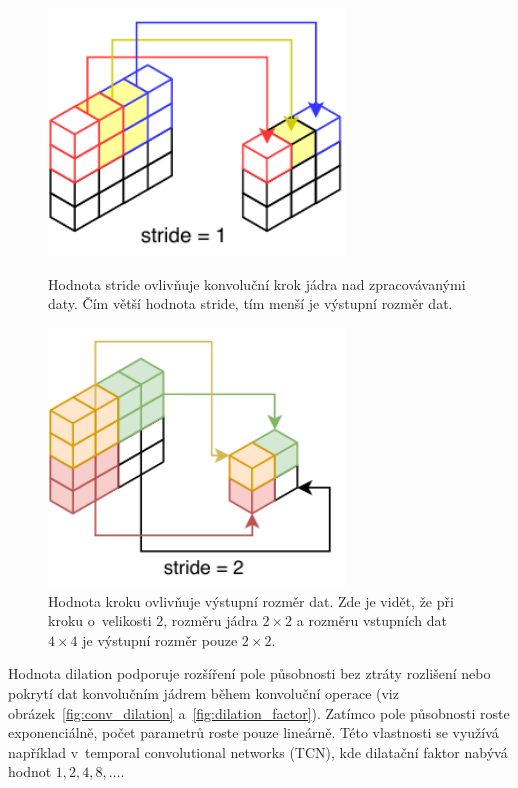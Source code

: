 \begin{figure}[H]
    \centering
    \begin{minipage}{0.45\textwidth}
        \centering
        \includegraphics[width=0.7\textwidth]{obrazky-figures/stride1.pdf}
        \caption{\label{fig:conv_stride1}Hodnota stride ovlivňuje konvoluční krok jádra nad zpracovávanými daty. Čím větší hodnota stride, tím menší je výstupní rozměr dat.}
    \end{minipage}\hfill
    \begin{minipage}{0.45\textwidth}
        \centering
        \includegraphics[width=0.7\textwidth]{obrazky-figures/stride2.pdf}
        \caption{\label{fig:conv_stride2}Hodnota kroku ovlivňuje výstupní rozměr dat. Zde je vidět, že při kroku o~velikosti $2$, rozměru jádra $2 \times 2$ a rozměru vstupních dat $4 \times 4$ je výstupní rozměr pouze $2 \times 2$.}
    \end{minipage}
\end{figure}


Hodnota dilation podporuje rozšíření pole působnosti bez ztráty rozlišení nebo pokrytí dat konvolučním jádrem během konvoluční operace (viz obrázek~\ref{fig:conv_dilation} a~\ref{fig:dilation_factor}). Zatímco pole působnosti roste exponenciálně, počet parametrů roste pouze lineárně. Této vlastnosti se využívá například v~temporal convolutional networks (TCN), kde dilatační faktor nabývá hodnot $1, 2, 4, 8, \dots$.

